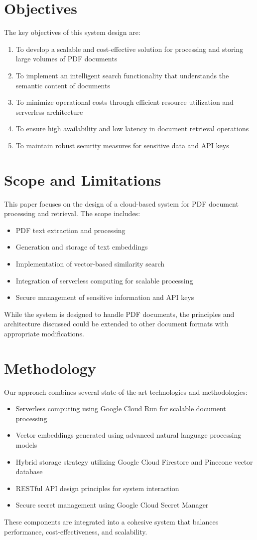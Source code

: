 \documentclass[a4paper, 12pt]{report}
\begin{document}
\section{Objectives}
The key objectives of this system design are:
\begin{enumerate}
    \item To develop a scalable and cost-effective solution for processing and storing large volumes of PDF documents
    \item To implement an intelligent search functionality that understands the semantic content of documents
    \item To minimize operational costs through efficient resource utilization and serverless architecture
    \item To ensure high availability and low latency in document retrieval operations
    \item To maintain robust security measures for sensitive data and API keys
\end{enumerate}

\section{Scope and Limitations}
This paper focuses on the design of a cloud-based system for PDF document processing and retrieval. The scope includes:
\begin{itemize}
    \item PDF text extraction and processing
    \item Generation and storage of text embeddings
    \item Implementation of vector-based similarity search
    \item Integration of serverless computing for scalable processing
    \item Secure management of sensitive information and API keys
\end{itemize}
While the system is designed to handle PDF documents, the principles and architecture discussed could be extended to other document formats with appropriate modifications.

\section{Methodology}
Our approach combines several state-of-the-art technologies and methodologies:
\begin{itemize}
    \item Serverless computing using Google Cloud Run for scalable document processing
    \item Vector embeddings generated using advanced natural language processing models
    \item Hybrid storage strategy utilizing Google Cloud Firestore and Pinecone vector database
    \item RESTful API design principles for system interaction
    \item Secure secret management using Google Cloud Secret Manager
\end{itemize}
These components are integrated into a cohesive system that balances performance, cost-effectiveness, and scalability.
\end{document}
